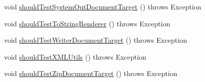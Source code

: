 \begin{DoxyCompactItemize}
void \hyperlink{classorg_1_1semanticweb_1_1owlapi_1_1contract_1_1_contract_owlapi_io_test_ae334b685c7b98e63dc216434cf1f89cf}{should\-Test\-System\-Out\-Document\-Target} ()  throws Exception 
\item 
void \hyperlink{classorg_1_1semanticweb_1_1owlapi_1_1contract_1_1_contract_owlapi_io_test_a853dd7df607d0e5dd07be6ae63a99c2c}{should\-Test\-To\-String\-Renderer} ()  throws Exception 
\item 
void \hyperlink{classorg_1_1semanticweb_1_1owlapi_1_1contract_1_1_contract_owlapi_io_test_ae3613e7e8dfb95f699ac8b490d00ad78}{should\-Test\-Writer\-Document\-Target} ()  throws Exception 
\item 
void \hyperlink{classorg_1_1semanticweb_1_1owlapi_1_1contract_1_1_contract_owlapi_io_test_a89eaabeac7f5510c24daa60cd51a32b0}{should\-Test\-X\-M\-L\-Utils} ()  throws Exception 
\item 
void \hyperlink{classorg_1_1semanticweb_1_1owlapi_1_1contract_1_1_contract_owlapi_io_test_af1867f646397996a5f598098301f9fa6}{should\-Test\-Zip\-Document\-Target} ()  throws Exception 
\end{DoxyCompactItemize}


